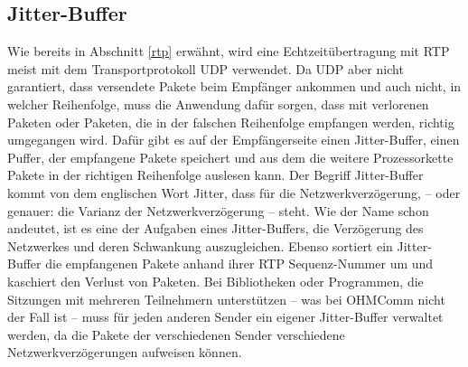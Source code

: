 \subsection{Jitter-Buffer}
\label{jitterBuffer}
Wie bereits in Abschnitt \ref{rtp} erwähnt, wird eine Echtzeitübertragung mit RTP meist mit dem Transportprotokoll UDP verwendet. Da UDP aber nicht garantiert, dass versendete Pakete beim Empfänger ankommen und auch nicht, in welcher Reihenfolge, muss die Anwendung dafür sorgen, dass mit verlorenen Paketen oder Paketen, die in der falschen Reihenfolge empfangen werden, richtig umgegangen wird. Dafür gibt es auf der Empfängerseite einen Jitter-Buffer, einen Puffer, der empfangene Pakete speichert und aus dem die weitere Prozessorkette Pakete in der richtigen Reihenfolge auslesen kann. Der Begriff Jitter-Buffer kommt von dem englischen Wort Jitter, dass für die Netzwerkverzögerung, -- oder genauer: die Varianz der Netzwerkverzögerung -- steht. Wie der Name schon andeutet, ist es eine der Aufgaben eines Jitter-Buffers, die Verzögerung des Netzwerkes und deren Schwankung auszugleichen. Ebenso sortiert ein Jitter-Buffer die empfangenen Pakete anhand ihrer RTP Sequenz-Nummer um und kaschiert den Verlust von Paketen. Bei Bibliotheken oder Programmen, die Sitzungen mit mehreren Teilnehmern unterstützen -- was bei OHMComm nicht der Fall ist -- muss für jeden anderen Sender ein eigener Jitter-Buffer verwaltet werden, da die Pakete der verschiedenen Sender verschiedene Netzwerkverzögerungen aufweisen können.
\\

